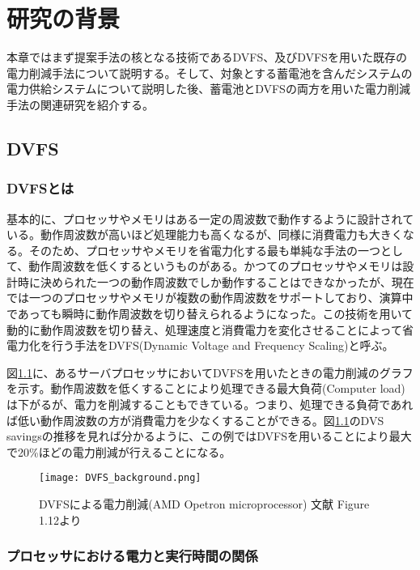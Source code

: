 \chapter{研究の背景}
\label{chap:background}

本章ではまず提案手法の核となる技術であるDVFS、及びDVFSを用いた既存の電力削減手法について説明する。そして、対象とする蓄電池を含んだシステムの電力供給システムについて説明した後、蓄電池とDVFSの両方を用いた電力削減手法の関連研究を紹介する。

\section{DVFS}
\label{sec:dvfs}

\subsection{DVFSとは}

基本的に、プロセッサやメモリはある一定の周波数で動作するように設計されている。動作周波数が高いほど処理能力も高くなるが、同様に消費電力も大きくなる。そのため、プロセッサやメモリを省電力化する最も単純な手法の一つとして、動作周波数を低くするというものがある。かつてのプロセッサやメモリは設計時に決められた一つの動作周波数でしか動作することはできなかったが、現在では一つのプロセッサやメモリが複数の動作周波数をサポートしており、演算中であっても瞬時に動作周波数を切り替えられるようになった。この技術を用いて動的に動作周波数を切り替え、処理速度と消費電力を変化させることによって省電力化を行う手法をDVFS(Dynamic Voltage and Frequency Scaling)と呼ぶ。

図\ref{fig:dvfs_background}に、あるサーバプロセッサにおいてDVFSを用いたときの電力削減のグラフを示す\cite{Hennessy:2011:CAF:1999263}。動作周波数を低くすることにより処理できる最大負荷(Computer load)は下がるが、電力を削減することもできている。つまり、処理できる負荷であれば低い動作周波数の方が消費電力を少なくすることができる。図\ref{fig:dvfs_background}のDVS savingsの推移を見れば分かるように、この例ではDVFSを用いることにより最大で20\%ほどの電力削減が行えることになる。
\begin{figure}[t]
 \begin{center}
  \texttt{[image: DVFS\_background.png]}
 \end{center}
 \caption{DVFSによる電力削減(AMD Opetron microprocessor) 文献\cite{Hennessy:2011:CAF:1999263} Figure 1.12より}
 \label{fig:dvfs_background}
\end{figure}


\subsection{プロセッサにおける電力と実行時間の関係}


